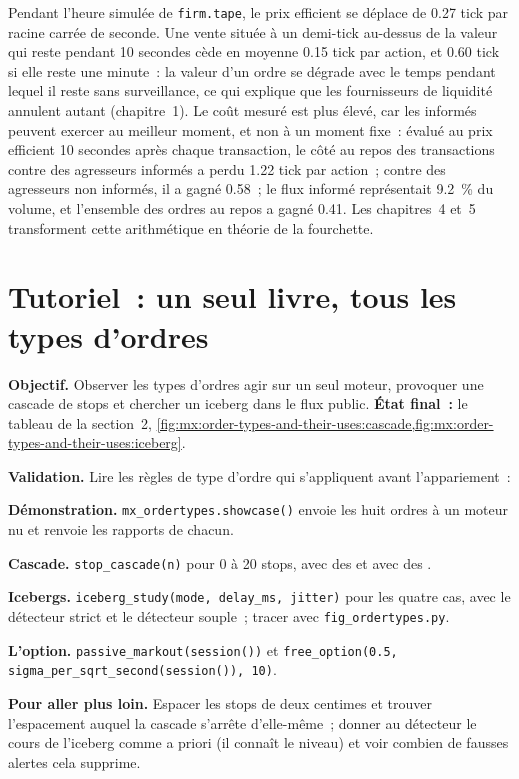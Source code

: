 Pendant l'heure simulée de \texttt{firm.tape}, le prix efficient se déplace de 0.27 tick par racine carrée de seconde. Une vente située à un demi-tick au-dessus de la valeur qui reste pendant
10 secondes cède en moyenne 0.15 tick par action, et 0.60 tick si elle reste une minute~: la valeur d'un ordre se dégrade avec le temps pendant lequel il reste
sans surveillance, ce qui explique que les fournisseurs de liquidité annulent autant (chapitre~1). Le coût mesuré est plus élevé, car les informés peuvent exercer au meilleur
moment, et non à un moment fixe~: évalué au prix efficient 10 secondes après chaque transaction, le côté au repos des transactions contre des agresseurs informés a perdu 1.22
tick par action~; contre des agresseurs non informés, il a gagné 0.58~; le flux informé représentait 9.2~\% du volume, et l'ensemble des ordres au repos a gagné 0.41. Les chapitres~4 et~5
transforment cette arithmétique en théorie de la fourchette.

\section{Tutoriel~: un seul livre, tous les types d'ordres}\label{tut:mx:order-types-and-their-uses:tut}

\begin{tutorial}
\textbf{Objectif.} Observer les types d'ordres agir sur un seul moteur, provoquer une cascade de stops et chercher un iceberg dans le flux public. \textbf{État final~:}
le tableau de la section~2, \cref{fig:mx:order-types-and-their-uses:cascade,fig:mx:order-types-and-their-uses:iceberg}.
\begin{tutsteps}
\item \textbf{Validation.} Lire les règles de type d'ordre qui s'appliquent avant l'appariement~:
\label{lst:mx:order-types-and-their-uses:validate}
\item \textbf{Démonstration.} \texttt{mx\_ordertypes.showcase()} envoie les huit ordres à un moteur nu et renvoie les rapports de chacun.
\item \textbf{Cascade.} \texttt{stop\_cascade(n)} pour 0 à 20 stops, avec des  et avec des .
\item \textbf{Icebergs.} \texttt{iceberg\_study(mode, delay\_ms, jitter)} pour les quatre cas, avec le détecteur strict et le détecteur souple~; tracer avec
\texttt{fig\_ordertypes.py}.
\item \textbf{L'option.} \texttt{passive\_markout(session())} et \texttt{free\_option(0.5, sigma\_per\_sqrt\_second(session()), 10)}.
\end{tutsteps}
\textbf{Pour aller plus loin.} Espacer les stops de deux centimes et trouver l'espacement auquel la cascade s'arrête d'elle-même~; donner au détecteur le
cours de l'iceberg comme a priori (il connaît le niveau) et voir combien de fausses alertes cela supprime.
\end{tutorial}

